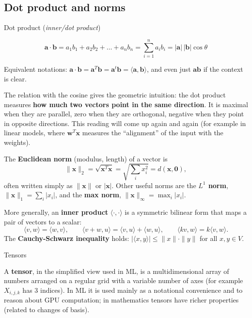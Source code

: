 \subsection{Dot product and norms}\label{prodotto-scalare-e-norme}

\begin{boxdefinition}{Dot product (\emph{inner/dot product})}

\[
\mathbf{a} \cdot \mathbf{b} = a_1 b_1 + a_2 b_2 + \dots + a_n b_n = \sum_{i=1}^{n} a_i b_i = |\mathbf{a}|\,|\mathbf{b}| \cos\theta
\]

Equivalent notations:
\(\mathbf{a}\cdot\mathbf{b} = \mathbf{a}^T\mathbf{b} = \mathbf{a}^t\mathbf{b} = \langle \mathbf{a}, \mathbf{b}\rangle\),
and even just \(\mathbf{ab}\) if the context is clear.

\end{boxdefinition}

The relation with the cosine gives the geometric intuition: the dot
product measures \textbf{how much two vectors point in the same
direction}. It is maximal when they are parallel, zero when they are
orthogonal, negative when they point in opposite directions. This
reading will come up again and again (for example in linear models,
where \(\mathbf{w}^T\mathbf{x}\) measures the ``alignment'' of the
input with the weights).

The \textbf{Euclidean norm} (modulus, length) of a vector is \[
\|\mathbf{x}\|_2 = \sqrt{\mathbf{x}^T\mathbf{x}} = \sqrt{\sum_i x_i^2} = d(\mathbf{x}, \mathbf{0}),
\] often written simply as \(\|\mathbf{x}\|\) or \(|\mathbf{x}|\).
Other useful norms are the \textbf{\(L^1\) norm},
\(\|\mathbf{x}\|_1 = \sum_i |x_i|\), and the \textbf{max norm},
\(\|\mathbf{x}\|_\infty = \max_i |x_i|\).

More generally, an \textbf{inner product}
\(\langle \cdot,\cdot \rangle\) is a symmetric bilinear form that maps
a pair of vectors to a scalar: \[
\langle v, w\rangle = \langle w, v\rangle, \qquad \langle v+w, u\rangle = \langle v,u\rangle + \langle w,u\rangle, \qquad \langle kv, w\rangle = k\langle v, w\rangle.
\] The \textbf{Cauchy-Schwarz inequality} holds:
\(|\langle x, y\rangle| \le \|x\|\cdot\|y\|\) for all \(x, y \in V\).

\begin{boxnote}{Tensors}

A \textbf{tensor}, in the simplified view used in ML, is a
multidimensional array of numbers arranged on a regular grid with a
variable number of axes (for example \(X_{i,j,k}\) has 3 indices). In
ML it is used mainly as a notational convenience and to reason about
GPU computation; in mathematics tensors have richer properties (related
to changes of basis).

\end{boxnote}

